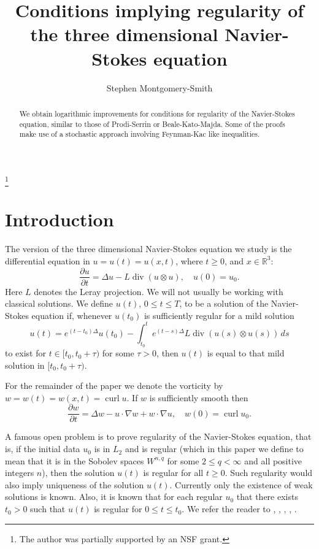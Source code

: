 \documentclass[12pt]{amsart}
\theoremstyle{remark}
\newcommand{\R}{{\mathbb R}}
\DeclareMathOperator{\curl}{curl}
\DeclareMathOperator{\divergence}{div}
\begin{document}
\title[Regularity of Navier-Stokes]
{Conditions implying regularity of the three dimensional Navier-Stokes
equation}
\author{Stephen Montgomery-Smith}
\makeatletter
\address{Department of Mathematics,
University of Missouri,
Columbia, MO 65211}
\thanks{The author was
partially supported
by an NSF grant.}

\begin{abstract}
We obtain logarithmic improvements for 
conditions for regularity of the
Navier-Stokes equation, similar to those of Prodi-Serrin or
Beale-Kato-Majda.  
Some of the proofs make use
of a stochastic approach involving Feynman-Kac like inequalities.
\end{abstract}

\maketitle

\section{Introduction}

The version of the three dimensional
Navier-Stokes equation we study is the
differential equation in
$u = u(t) = u(x,t)$, where $ t\ge 0$, and $x \in \R^3$:
$$ \frac{\partial u}{\partial t}
   = \Delta u - L\divergence(u \otimes u),
   \quad u(0) = u_0.$$
Here $L$ denotes the Leray projection.
We will not usually be working with classical solutions.  We define
$u(t)$, $0 \le t \le T$,
to be a solution of the Navier-Stokes equation if, whenever $u(t_0)$ is 
sufficiently regular for a mild solution
$$ u(t) = e^{(t-t_0)\Delta} u(t_0) - \int_{t_0}^t
   e^{(t-s)\Delta} L\divergence(u(s) \otimes u(s)) \, ds $$   
to exist for 
$t \in [t_0,t_0+\tau)$ for some $\tau>0$, 
then $u(t)$ is equal to that mild solution in $[t_0,t_0+\tau)$.

For the remainder of the paper
we denote the vorticity by $w = w(t) = w(x,t) = \curl u$.
If $w$ is sufficiently smooth then
$$ \frac{\partial w}{\partial t}
   = \Delta w - u \cdot \nabla w + w \cdot \nabla u ,
   \quad w(0) = \curl u_0 .$$

A famous open problem is to prove regularity of the Navier-Stokes
equation, that is, if the initial data $u_0$ is in $L_2$ and is
regular (which in this paper we define to mean that it is
in the Sobolev spaces $W^{n,q}$ for some $2\le q<\infty$ and all positive
integers $n$), then the solution $u(t)$ is regular for all
$t\ge0$.  Such regularity would also imply uniqueness of the solution
$u(t)$.  Currently only the existence of weak solutions is known.
Also, it is known that for each regular $u_0$ that there exists
$t_0>0$ such that $u(t)$ is regular for $0\le t \le t_0$.
We refer the reader to 
\cite{cannone}, \cite{constantin-foias}, \cite{doering-gibbons},
\cite{lemarie-rieusset}, \cite{temam}.
\end{document}
